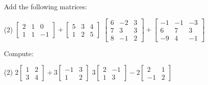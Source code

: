 \begin{exercise}
Add the following matrices:
\begin{tasks}(2)
\task
$\begin{bmatrix}
2 & 1 & 0 \\
1 & 1 & -1
\end{bmatrix}
+
\begin{bmatrix}
5 & 3 & 4 \\
1 & 2 & 5
\end{bmatrix}$
\task
$\begin{bmatrix}
6 & -2 & 3 \\
7 & 3 & 3 \\
8 & -1 & 2
\end{bmatrix}
+
\begin{bmatrix}
-1 & -1 & -3 \\
6 & 7 & 3 \\
-9 & 4 & -1
\end{bmatrix}$
\end{tasks}
\end{exercise}

\begin{exercise}
Compute:
\begin{tasks}(2)
\task
$2\begin{bmatrix}
1 & 2 \\
3 & 4
\end{bmatrix}
+
3
\begin{bmatrix}
-1 & 3 \\
1 & 2
\end{bmatrix}$
\task
$3\begin{bmatrix}
2 & -1 \\
1 & 3
\end{bmatrix}
-
2
\begin{bmatrix}
2 & 1 \\
-1 & 2
\end{bmatrix}$
\end{tasks}
\end{exercise}

